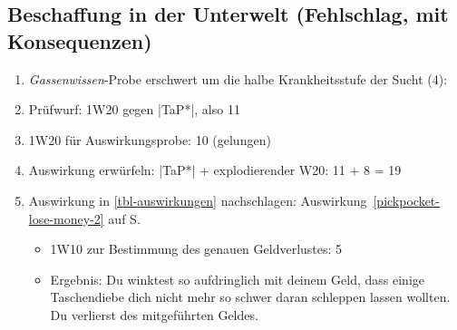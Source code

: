 \subsection{Beschaffung in der Unterwelt (Fehlschlag, mit Konsequenzen)}
\begin{enumerate}
	\item \emph{Gassenwissen}-Probe erschwert um die halbe Krankheitsstufe der Sucht (4): 
	\item Prüfwurf: 1W20 gegen |TaP*|, also 11
	\item 1W20 für Auswirkungsprobe: 10 (gelungen)
	\item Auswirkung erwürfeln: |TaP*| + explodierender W20: 11 + 8 = 19
	\item Auswirkung in \vref{tbl-auswirkungen} nachschlagen: Auswirkung~\ref{pickpocket-lose-money-2} auf S.~\pageref{pickpocket-lose-money-2}
	\begin{itemize}
		\item 1W10 zur Bestimmung des genauen Geldverlustes: 5
		\item Ergebnis: Du winktest so aufdringlich mit deinem Geld, dass einige Taschendiebe dich nicht mehr so schwer daran schleppen lassen wollten. Du verlierst  des mitgeführten Geldes.
	\end{itemize}
\end{enumerate}


